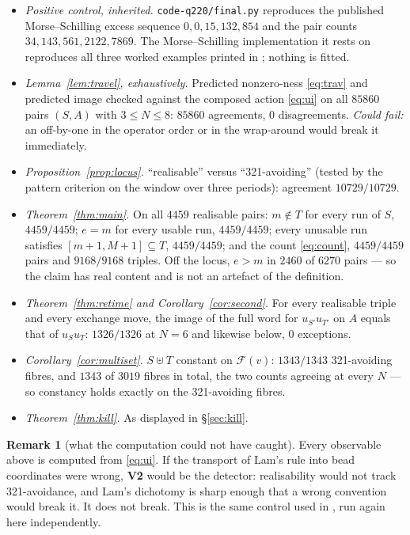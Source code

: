 \documentclass[11pt]{article}
\theoremstyle{plain}
\theoremstyle{definition}
\newtheorem{rem}[thm]{Remark}
\begin{document}
\begin{itemize}
\item[\textbf{V0}] \emph{Positive control, inherited.} \texttt{code-q220/final.py} reproduces
the published Morse--Schilling excess sequence $0,0,15,132,854$ and the pair counts
$34,143,561,2122,7869$. The Morse--Schilling implementation it rests on reproduces all three
worked examples printed in \cite{MorseSchilling}; nothing is fitted.
\item[\textbf{V1}] \emph{Lemma~\ref{lem:travel}, exhaustively.} Predicted nonzero-ness
\eqref{eq:trav} and predicted image checked against the composed action \eqref{eq:ui} on all
$85860$ pairs $(S,A)$ with $3\le N\le8$: $85860$ agreements, $0$ disagreements. \emph{Could
fail:} an off-by-one in the operator order or in the wrap-around would break it immediately.
\item[\textbf{V2}] \emph{Proposition~\ref{prop:locus}.} ``realisable'' versus ``321-avoiding''
(tested by the pattern criterion on the window over three periods): agreement
$10729/10729$.
\item[\textbf{V3}] \emph{Theorem~\ref{thm:main}.} On all $4459$ realisable pairs: $m\notin T$
for every run of $S$, $4459/4459$; $e=m$ for every usable run, $4459/4459$; every unusable run
satisfies $[m+1,M+1]\subseteq T$, $4459/4459$; and the count \eqref{eq:count},
$4459/4459$ pairs and $9168/9168$ triples. Off the locus, $e>m$ in $2460$ of $6270$ pairs ---
so the claim has real content and is not an artefact of the definition.
\item[\textbf{V4}] \emph{Theorem~\ref{thm:retime} and Corollary~\ref{cor:second}.} For every
realisable triple and every exchange move, the image of the full word for $u_{S'}u_{T'}$ on $A$
equals that of $u_Su_T$: $1326/1326$ at $N=6$ and likewise below, $0$ exceptions.
\item[\textbf{V5}] \emph{Corollary~\ref{cor:multiset}.} $S\uplus T$ constant on
$\mathcal{F}(v)$: $1343/1343$ 321-avoiding fibres, and $1343$ of $3019$ fibres in total, the
two counts agreeing at every $N$ --- so constancy holds exactly on the 321-avoiding fibres.
\item[\textbf{V6}] \emph{Theorem~\ref{thm:kill}.} As displayed in \S\ref{sec:kill}.
\end{itemize}

\begin{rem}[what the computation could not have caught]
Every observable above is computed from \eqref{eq:ui}. If the transport of Lam's rule into bead
coordinates were wrong, \textbf{V2} would be the detector: realisability would not track
321-avoidance, and Lam's dichotomy is sharp enough that a wrong convention would break it. It
does not break. This is the same control used in \cite[\S6]{Clio321}, run again here
independently.
\end{rem}
\end{document}
